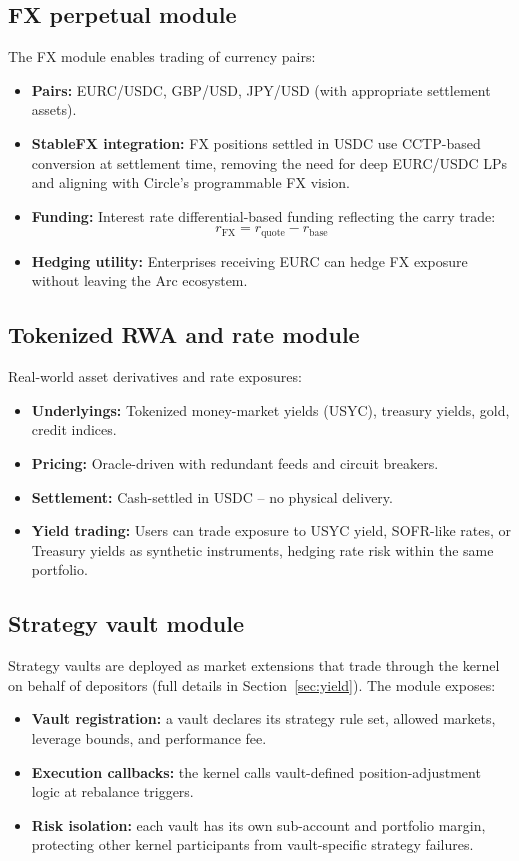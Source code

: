 \documentclass[11pt,a4paper]{article}
\begin{document}
\subsection{FX perpetual module}

The FX module enables trading of currency pairs:
\begin{itemize}
  \item \textbf{Pairs:} EURC/USDC, GBP/USD, JPY/USD (with appropriate settlement assets).
  \item \textbf{StableFX integration:} FX positions settled in USDC use CCTP-based conversion at settlement time, removing the need for deep EURC/USDC LPs and aligning with Circle's programmable FX vision.
  \item \textbf{Funding:} Interest rate differential-based funding reflecting the carry trade:
  \[
  r_{\text{FX}} = r_{\text{quote}} - r_{\text{base}}
  \]
  \item \textbf{Hedging utility:} Enterprises receiving EURC can hedge FX exposure without leaving the Arc ecosystem.
\end{itemize}

\subsection{Tokenized RWA and rate module}

Real-world asset derivatives and rate exposures:
\begin{itemize}
  \item \textbf{Underlyings:} Tokenized money-market yields (USYC), treasury yields, gold, credit indices.
  \item \textbf{Pricing:} Oracle-driven with redundant feeds and circuit breakers.
  \item \textbf{Settlement:} Cash-settled in USDC -- no physical delivery.
  \item \textbf{Yield trading:} Users can trade exposure to USYC yield, SOFR-like rates, or Treasury yields as synthetic instruments, hedging rate risk within the same portfolio.
\end{itemize}

\subsection{Strategy vault module}

Strategy vaults are deployed as market extensions that trade through the kernel on behalf of depositors (full details in Section~\ref{sec:yield}). The module exposes:
\begin{itemize}
  \item \textbf{Vault registration:} a vault declares its strategy rule set, allowed markets, leverage bounds, and performance fee.
  \item \textbf{Execution callbacks:} the kernel calls vault-defined position-adjustment logic at rebalance triggers.
  \item \textbf{Risk isolation:} each vault has its own sub-account and portfolio margin, protecting other kernel participants from vault-specific strategy failures.
\end{itemize}
\end{document}
